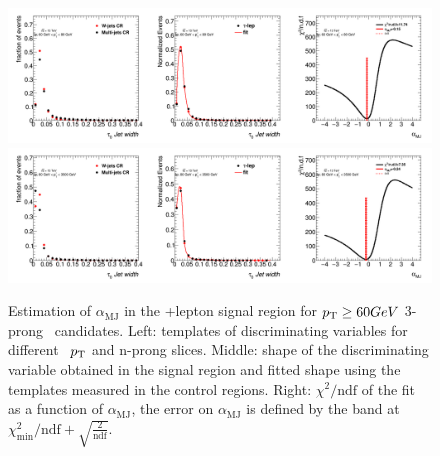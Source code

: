 	\begin{figure}
	\begin{center}
	\includegraphics[width=1\textwidth]{chapters/chapter6_HPlus/images/FFs/FFs_FIT_SR_TAULEP_3_60_80.png}
	\includegraphics[width=1\textwidth]{chapters/chapter6_HPlus/images/FFs/FFs_FIT_SR_TAULEP_3_80_3500.png}
	\end{center}
	\caption{
	Estimation of $\alpha_\mathrm{MJ}$ in the \tauhad+lepton signal region for $p_{\text{T}} \geq 60 GeV$
	3-prong \tauhad\ candidates. Left: templates of discriminating variables for different \tauhad\ $p_{\text{T}}$
	and n-prong slices. Middle: shape of the discriminating variable obtained in the signal region and fitted
	shape using the templates measured in the control regions. Right: $\chi^2/\mathrm{ndf}$ of the fit as a
	function of $\alpha_\mathrm{MJ}$, the error on $\alpha_\mathrm{MJ}$ is defined by the band at
	$\chi^2_\mathrm{min}/\mathrm{ndf}+\sqrt{\frac{2}{\mathrm{ndf}}}$.
	}
	\label{fig:mm:Fits:region7_4}
	\end{figure}